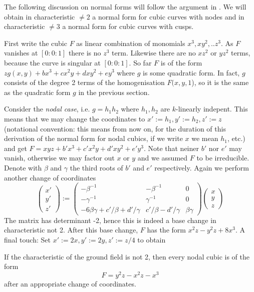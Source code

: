The following discussion on normal forms will follow the argument in \cite[Satz 4.9, p.102]{hulek2000elementare}.
We will obtain in characteristic $\neq 2$ a normal form for cubic curves with nodes and in characteristic $\neq 3$ a normal form for cubic curves with cusps.

First write the cubic $F$ as linear combination of monomials $x^3,xy^2,..z^3$.
As $F$ vanishes at $[0:0:1]$ there is no $z^3$ term.
Likewise there are no $xz^2$ or $yz^2$ terms, because the curve is singular at $[0:0:1]$.
So far $F$ is of the form $zg(x,y) + bx^3 + cx^2y + dxy^2 + ey^3$ where $g$ is some quadratic form.
In fact, $g$ consists of the degree 2 terms of the homogenisation $F(x,y,1$), so it is the same as the quadratic form $g$ in the previous section.

Consider the \emph{nodal case}, i.e. $g=h_1h_2$ where $h_1,h_2$ are $k$-linearly indepent.
This means that we may change the coordinates to $x':=h_1, y':=h_2, z':=z$ (notational convention: this means from now on, for the duration of this derivation of the normal form for nodal cubics, if we write $x$ we mean $h_1$, etc.) and get $F = xyz + b'x^3 + c'x^2y + d'xy^2 + e'y^3$.
Note that neiner $b'$ nor $e'$ may vanish, otherwise we may factor out $x$ or $y$ and we assumed $F$ to be irreducible.
Denote with $\beta$ and $\gamma$ the third roots of $b'$ and $e'$ respectively.
Again we perform another change of coordinates
\begin{equation}
\begin{pmatrix} x' \\ y' \\ z' \end{pmatrix}
:=
\begin{pmatrix}
-\beta^{-1} & -\beta^{-1} & 0 \\
-\gamma^{-1} & \gamma^{-1} & 0 \\
-6\beta\gamma + c'/\beta + d'/\gamma & c'/\beta - d'/\gamma & \beta\gamma
\end{pmatrix}
\begin{pmatrix} x \\ y \\ z \end{pmatrix}
\end{equation}
The matrix has determinant -2, hence this is indeed a base change in characteristic not 2.
After this base change, $F$ has the form $x^2z - y^2z +8x^3$.
A final touch: Set $x' := 2x, y':= 2y,z':=z/4$ to obtain
\begin{proposition} \label{propositionNormalformNodal}
If the characteristic of the ground field is not 2, then every nodal cubic is of the form
\begin{equation}
F = y^2z - x^2z - x^3
\end{equation}
after an appropriate change of coordinates.
\end{proposition}

